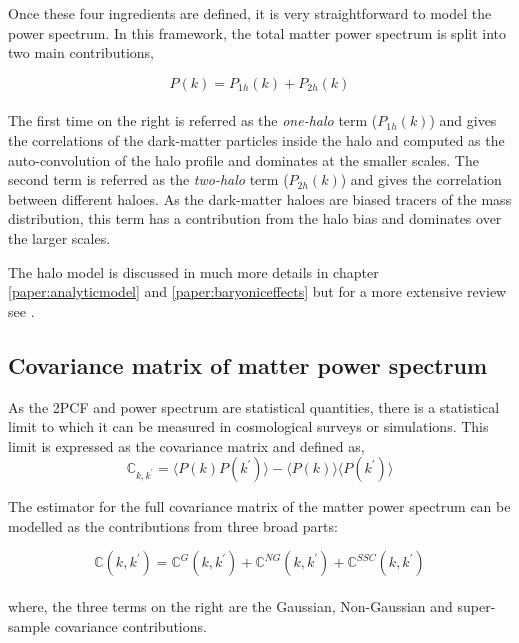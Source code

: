 Once these four ingredients are defined, 
it is very straightforward to model the power spectrum. In this framework, the
total matter power spectrum is split into two main contributions,

\begin{equation}
	P(k) = P_{1h}(k)  + P_{2h}(k)
\end{equation}
\\
The first time on the right is referred as the {\it one-halo} term ($P_{1h}(k)$) and gives
the correlations of the dark-matter particles inside the halo and computed as
the auto-convolution of the halo profile and dominates at the smaller scales. 
The second term is referred as the {\it two-halo}
term ($P_{2h}(k)$) and gives the correlation between different haloes. As the 
dark-matter haloes are biased tracers of the mass distribution, this term has a 
contribution from the halo bias and dominates over the larger scales. 

The halo model is discussed in much more details in chapter \ref{paper:analyticmodel} 
and \ref{paper:baryoniceffects} but for a more extensive review see
\cite{2002PhR...372....1C}.


\subsection{Covariance matrix of matter power spectrum}
As the 2PCF and power spectrum are statistical quantities, there is a statistical limit
to which it can be measured in cosmological surveys or simulations. This limit is expressed
as the covariance matrix and defined as,
\begin{equation}
	\mathbb{C}_{k,k^{\prime}}	= 
			\langle P(k)P(k^{\prime}) \rangle - 
			\langle P(k)\rangle \langle P(k^{\prime})\rangle
\end{equation}

The estimator for the full covariance matrix of the matter power spectrum 
can be modelled as the contributions from three broad parts:

\begin{equation}
	\mathbb{C}(k,k^{\prime}) = \mathbb{C}^{G}(k,k^{\prime}) + 
								\mathbb{C}^{NG}(k,k^{\prime}) + 
								\mathbb{C}^{SSC}(k,k^{\prime})
\end{equation}
\\
where, the three terms on the right are the Gaussian, Non-Gaussian and super-sample covariance contributions. 

